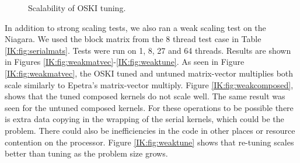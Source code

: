 \begin{figure}[htbp]
\begin{center}
\caption{Scalability of OSKI tuning.}
\label{IK:fig:tuningscale}
\end{center}
\end{figure}

In addition to strong scaling tests, we also ran a weak scaling test on the Niagara.  We used the block
matrix from the 8 thread test case in Table \ref{IK:fig:serialmats}.  Tests were run on 1, 8, 27 and 64 threads.
Results are shown in Figures \ref{IK:fig:weakmatvec}-\ref{IK:fig:weaktune}.  As seen in Figure \ref{IK:fig:weakmatvec}, the OSKI tuned and untuned  matrix-vector
multiplies both scale similarly to Epetra's matrix-vector multiply.  Figure \ref{IK:fig:weakcomposed}, shows that the tuned
composed kernels do not scale well.  The same result was seen for the untuned composed kernels.  For these operations
to be possible there is extra data copying in the wrapping of the serial kernels, which could be the problem.  There could also be
inefficiencies in the code in other places or resource contention on the processor.
Figure \ref{IK:fig:weaktune} shows that re-tuning scales better than tuning as
the problem size grows.

